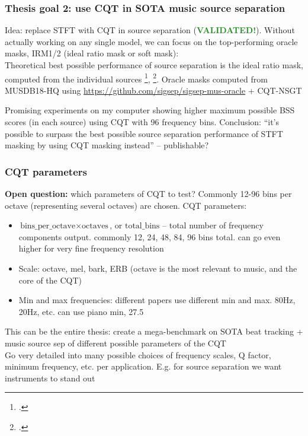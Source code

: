 \documentclass[usenames,dvipsnames]{beamer}
\begin{document}
\begin{frame}
	\frametitle{Thesis goal 2: use CQT in SOTA music source separation}
	Idea: replace STFT with CQT in source separation (\textcolor{ForestGreen}{\textbf{VALIDATED!}}). Without actually working on any single model, we can focus on the top-performing oracle masks, IRM1/2 (ideal ratio mask or soft mask):\\
	Theoretical best possible performance of source separation is the ideal ratio mask, computed from the individual sources \footcite{irm}, \footcite{sigsep2018}. Oracle masks computed from MUSDB18-HQ using \href{https://github.com/sigsep/sigsep-mus-oracle}{https://github.com/sigsep/sigsep-mus-oracle} + CQT-NSGT\\

	\vspace{1em}

	Promising experiments on my computer showing higher maximum possible BSS scores (in each source) using CQT with 96 frequency bins. Conclusion: ``it's possible to surpass the best possible source separation performance of STFT masking by using CQT masking instead'' -- publishable? 
\end{frame}

\begin{frame}
	\frametitle{CQT parameters}
	\textbf{Open question:} which parameters of CQT to test? Commonly 12-96 bins per octave (representing several octaves) are chosen.
	CQT parameters:
	\begin{itemize}
		\item
			$\text{bins\_per\_octave} \times \text{octaves}$, or $\text{total\_bins}$ -- total number of frequency components output. commonly 12, 24, 48, 84, 96 bins total. can go even higher for very fine frequency resolution
		\item
			Scale: octave, mel, bark, ERB (octave is the most relevant to music, and the core of the CQT)
		\item
			Min and max frequencies: different papers use different min and max. 80Hz, 20Hz, etc. can use piano min, 27.5
	\end{itemize}
	This can be the entire thesis: create a mega-benchmark on SOTA beat tracking + music source sep of different possible parameters of the CQT\\
	Go very detailed into many possible choices of frequency scales, Q factor, minimum frequency, etc. per application. E.g. for source separation we want instruments to stand out
\end{frame}
\end{document}
